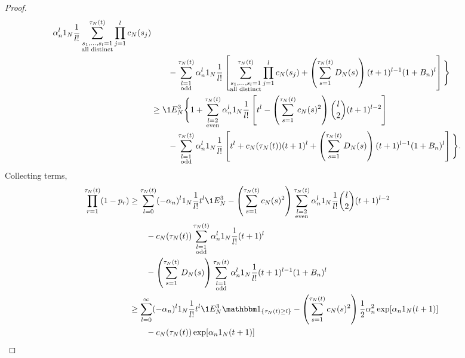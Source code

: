 \begin{proof}
\begin{align*}
        \alpha_n^l \ON \frac{1}{l!} 
        \sum_{\substack{ s_1, \dots, s_l =1 \\ \text{all distinct} }}^{\tau_N(t)}
        \prod_{j=1}^l c_N(s_j) \\
    &\qquad- \sum_{\substack{l=1 \\ \text{odd} }}^{\tau_N(t)} 
        \alpha_n^l \ON \frac{1}{l!}
        \left[ \sum_{\substack{ s_1, \dots, s_l =1 \\ \text{all distinct} }}^{\tau_N(t)}
        \prod_{j=1}^l c_N(s_j)
        + \left( \sum_{s=1}^{\tau_N(t)} D_N(s) \right)
        (t+1)^{l-1} (1+B_n)^l \right] \Bigg\} \\
&\geq \1{E_N^3} \Bigg\{ 1 + 
        \sum_{\substack{l=2 \\ \text{even} }}^{\tau_N(t)} 
        \alpha_n^l \ON \frac{1}{l!} 
        \left[ t^l - \left( \sum_{s=1}^{\tau_N(t)} c_N(s)^2 \right)
        \binom{l}{2}(t+1)^{l-2} \right] \\
    &\qquad- \sum_{\substack{l=1 \\ \text{odd} }}^{\tau_N(t)} 
        \alpha_n^l \ON \frac{1}{l!}
        \left[ t^l + c_N(\tau_N(t)) (t+1)^l
        + \left( \sum_{s=1}^{\tau_N(t)} D_N(s) \right)
        (t+1)^{l-1} (1+B_n)^l \right] \Bigg\} .
\end{align*}
Collecting terms,
\begin{align}
\prod_{r=1}^{\tau_N(t)} (1-p_r)
&\geq \sum_{l=0}^{\tau_N(t)} (-\alpha_n)^l \ON 
        \frac{1}{l!} t^l \1{E_N^3}
        - \left( \sum_{s=1}^{\tau_N(t)} c_N(s)^2 \right)
        \sum_{\substack{l=2 \\ \text{even} }}^{\tau_N(t)} 
        \alpha_n^l \ON \frac{1}{l!} \binom{l}{2}(t+1)^{l-2} \notag\\
    &\qquad- c_N(\tau_N(t)) \sum_{\substack{l=1 \\ \text{odd} }}^{\tau_N(t)} 
        \alpha_n^l \ON \frac{1}{l!} (t+1)^l \notag\\
    &\qquad- \left( \sum_{s=1}^{\tau_N(t)} D_N(s) \right)
        \sum_{\substack{l=1 \\ \text{odd} }}^{\tau_N(t)} 
        \alpha_n^l \ON \frac{1}{l!} (t+1)^{l-1} (1+B_n)^l \notag\\
&\geq \sum_{l=0}^{\infty} (-\alpha_n)^l \ON 
        \frac{1}{l!} t^l \1{E_N^3} \I{ \tau_N(t) \geq l}
        - \left( \sum_{s=1}^{\tau_N(t)} c_N(s)^2 \right)
        \frac{1}{2} \alpha_n^2 \exp[ \alpha_n \ON (t+1) ]\notag\\
    &\qquad- c_N(\tau_N(t)) \exp[ \alpha_n \ON (t+1) ] \notag\\

\end{align}
\end{proof}
